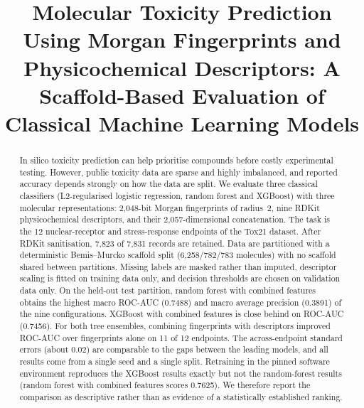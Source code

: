 \documentclass[conference]{IEEEtran}
\begin{document}
\title{Molecular Toxicity Prediction Using Morgan Fingerprints and Physicochemical Descriptors: A Scaffold-Based Evaluation of Classical Machine Learning Models}

\author{
}

\maketitle

\begin{abstract}
In silico toxicity prediction can help prioritise compounds before costly experimental testing. However, public toxicity data are sparse and highly imbalanced, and reported accuracy depends strongly on how the data are split. We evaluate three classical classifiers (L2-regularised logistic regression, random forest and XGBoost) with three molecular representations: 2,048-bit Morgan fingerprints of radius~2, nine RDKit physicochemical descriptors, and their 2,057-dimensional concatenation. The task is the 12 nuclear-receptor and stress-response endpoints of the Tox21 dataset. After RDKit sanitisation, 7,823 of 7,831 records are retained. Data are partitioned with a deterministic Bemis--Murcko scaffold split (6,258/782/783 molecules) with no scaffold shared between partitions. Missing labels are masked rather than imputed, descriptor scaling is fitted on training data only, and decision thresholds are chosen on validation data only. On the held-out test partition, random forest with combined features obtains the highest macro ROC-AUC (0.7488) and macro average precision (0.3891) of the nine configurations. XGBoost with combined features is close behind on ROC-AUC (0.7456). For both tree ensembles, combining fingerprints with descriptors improved ROC-AUC over fingerprints alone on 11 of 12 endpoints. The across-endpoint standard errors (about 0.02) are comparable to the gaps between the leading models, and all results come from a single seed and a single split. Retraining in the pinned software environment reproduces the XGBoost results exactly but not the random-forest results (random forest with combined features scores 0.7625). We therefore report the comparison as descriptive rather than as evidence of a statistically established ranking.
\end{abstract}
\end{document}
